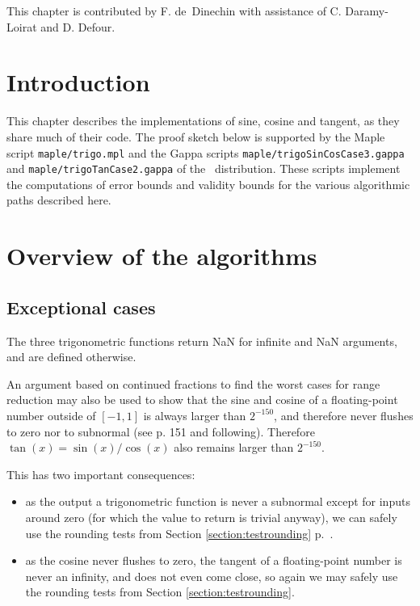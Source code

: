 This chapter is contributed by F. de~Dinechin with assistance of C.
Daramy-Loirat and D. Defour.

\section*{Introduction}
This chapter describes the implementations of sine, cosine and
tangent, as they share much of their code. The proof sketch below is
supported by the Maple script \texttt{maple/trigo.mpl} and the Gappa
scripts \texttt{maple/trigoSinCosCase3.gappa} and
\texttt{maple/trigoTanCase2.gappa} of the \crlibm\ distribution. These scripts 
implement the computations of error bounds and validity bounds for the
various algorithmic paths described here.

\section{Overview of the algorithms}

\subsection{Exceptional cases}

The three trigonometric functions return NaN for infinite and NaN
arguments, and are defined otherwise. 

An argument based on continued fractions to find the worst cases for
range reduction may also be used to show that the sine and cosine of a
floating-point number outside of $[-1,1]$ is always larger than
$2^{-150}$, and therefore never flushes to zero nor to subnormal (see
\cite{Muller97} p. 151 and following). Therefore
$\tan(x)=\sin(x)/\cos(x)$ also remains larger than $2^{-150}$.

This has two important consequences:

\begin{itemize}
\item as the output a trigonometric function is never a subnormal except for
  inputs around zero (for which the value to return is trivial
  anyway), we can safely use the rounding tests from Section
  \ref{section:testrounding} p.~\pageref{section:testrounding}.

\item as the cosine never flushes to zero, the tangent of a
  floating-point number is never an infinity, and does not even come
  close, so again we may safely use the rounding tests from Section
  \ref{section:testrounding}.
\end{itemize}

